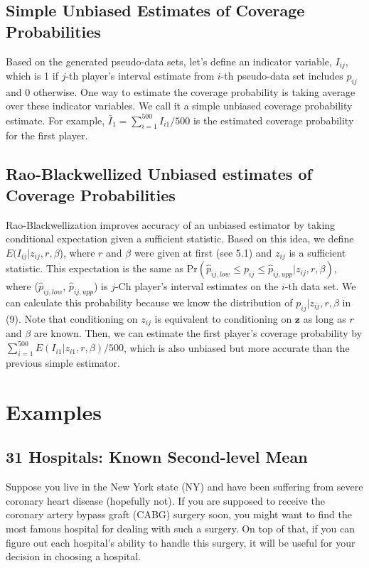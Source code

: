 \documentclass[article]{jss}
\begin{document}
\subsection{Simple Unbiased Estimates of Coverage Probabilities}
Based on the generated pseudo-data sets, let's define an indicator variable, $I_{ij}$, which is 1 if $j$-th player's interval estimate from $i$-th pseudo-data set includes $p_{ij}$ and 0 otherwise. One way to estimate the coverage probability is taking average over these indicator variables. We call it a simple unbiased coverage probability estimate. For example, $\bar{I}_{1}=\sum_{i=1}^{500}I_{i1}/500$ is the estimated coverage probability for the first player.

\subsection{Rao-Blackwellized Unbiased estimates of Coverage Probabilities}
Rao-Blackwellization improves accuracy of an unbiased estimator by taking conditional expectation given a sufficient statistic. Based on this idea, we define $E(I_{ij}\vert z_{ij}, r, \beta$), where $r$ and $\beta$ were given at first (see 5.1) and $z_{ij}$ is a sufficient statistic. This expectation is the same as Pr$(\hat{p}_{ij, low}\le p_{ij} \le\hat{p}_{ij, upp}\vert z_{ij}, r, \beta)$, where ($\hat{p}_{ij, low}$, $\hat{p}_{ij, upp}$) is $j$-Ch player's interval estimates on the $i$-th data set. We can calculate this probability  because we know the distribution of $p_{ij} \vert z_{ij}, r, \beta$ in (9). Note that conditioning on $z_{ij}$ is equivalent to conditioning on $\mathbf{z}$ as long as $r$ and $\beta$ are known. Then, we can estimate the first player's coverage probability by $\sum_{i=1}^{500}E(I_{i1}\vert z_{i1}, r, \beta)/500$, which is also unbiased but more accurate than the previous simple estimator.

\section[Examples]{Examples}
\subsection[Known Second-level Mean]{31 Hospitals: Known Second-level Mean}
Suppose you live in the New York state (NY) and have been suffering from severe coronary heart disease (hopefully not). If you are supposed to receive the coronary artery bypass graft (CABG) surgery soon, you might want to find the most famous hospital for dealing with such a surgery. On top of that, if you can figure out each hospital's ability to handle this surgery, it will be useful for your decision in choosing a hospital.
\end{document}
